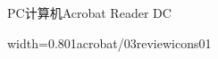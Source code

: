 \documentclass[fontset = none, t, aspectratio=169]{ctexbeamer}
\begin{document}
\begin{frame}{PC计算机}{Acrobat Reader DC}
\begin{center}
\begin{annotationimage}{width=0.8\textwidth}{01acrobat/03reviewicons01}
    \end{annotationimage}
  \end{center}
\end{frame}
\end{document}
